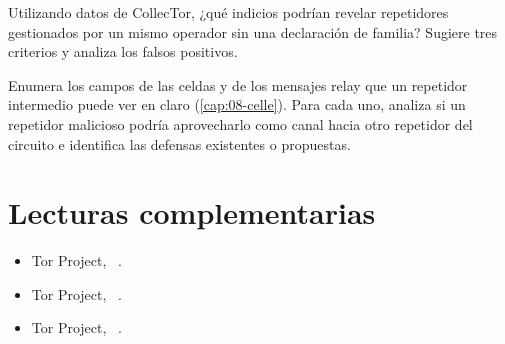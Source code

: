 \begin{esercizio}[2]\label{es:27-segnali}
Utilizando datos de CollecTor, ¿qué indicios podrían revelar repetidores gestionados por un mismo operador sin una declaración de familia? Sugiere tres criterios y analiza los falsos positivos.
\end{esercizio}

\begin{esercizio}[3]\label{es:27-canali}
Enumera los campos de las celdas y de los mensajes relay que un repetidor intermedio puede ver en claro (\cref{cap:08-celle}). Para cada uno, analiza si un repetidor malicioso podría aprovecharlo como canal hacia otro repetidor del circuito e identifica las defensas existentes o propuestas.
\end{esercizio}

\section*{Lecturas complementarias}
\begin{itemize}
  \item Tor Project, ~\cite{torblog2014relayearly}.
  \item Tor Project, ~\cite{torblog2022badrelays}.
  \item Tor Project, ~\cite{torblog2023pow}.
\end{itemize}
